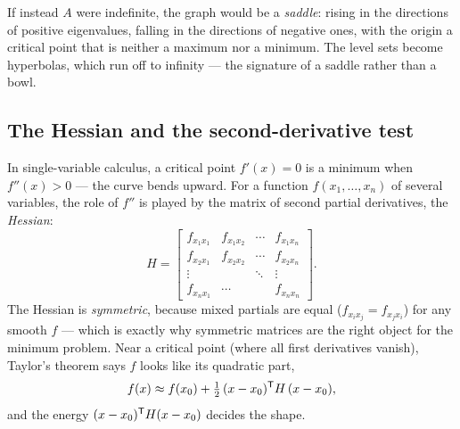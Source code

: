If instead $A$ were indefinite, the graph would be a \emph{saddle}: rising in the directions of positive eigenvalues, falling in the directions of negative ones, with the origin a critical point that is neither a maximum nor a minimum. The level sets become hyperbolas, which run off to infinity --- the signature of a saddle rather than a bowl.

\subsection{The Hessian and the second-derivative test}

In single-variable calculus, a critical point $f'(x)=0$ is a minimum when $f''(x)>0$ --- the curve bends upward. For a function $f(x_1,\dots,x_n)$ of several variables, the role of $f''$ is played by the matrix of second partial derivatives, the \emph{Hessian}:
\[
   H=\begin{bmatrix}
     f_{x_1x_1} & f_{x_1x_2} & \cdots & f_{x_1x_n}\\
     f_{x_2x_1} & f_{x_2x_2} & \cdots & f_{x_2x_n}\\
     \vdots & & \ddots & \vdots\\
     f_{x_nx_1} & \cdots & & f_{x_nx_n}
   \end{bmatrix}.
\]
The Hessian is \emph{symmetric}, because mixed partials are equal ($f_{x_ix_j}=f_{x_jx_i}$) for any smooth $f$ --- which is exactly why symmetric matrices are the right object for the minimum problem. Near a critical point (where all first derivatives vanish), Taylor's theorem says $f$ looks like its quadratic part,
\[
   f(x)\approx f(x_0)+\tfrac12\,(x-x_0)^{\mathsf T} H\,(x-x_0),
\]
and the energy $(x-x_0)^{\mathsf T} H(x-x_0)$ decides the shape.


